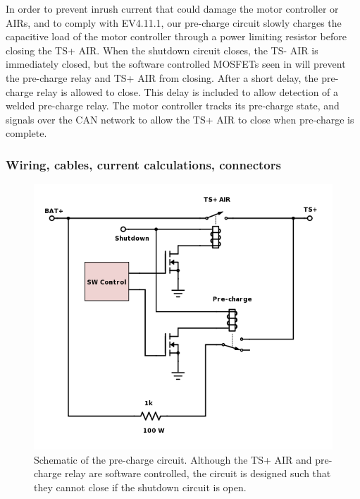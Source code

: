 \documentclass{article}
\begin{document}
In order to prevent inrush current that could damage the motor controller or AIRs, and to comply with EV4.11.1, our pre-charge circuit slowly charges the capacitive load of the motor controller through a power limiting resistor before closing the TS+ AIR. When the shutdown circuit closes, the TS- AIR is immediately closed, but the software controlled MOSFETs seen in  will prevent the pre-charge relay and TS+ AIR from closing. After a short delay, the pre-charge relay is allowed to close. This delay is included to allow detection of a welded pre-charge relay. The motor controller tracks its pre-charge state, and signals over the CAN network to allow the TS+ AIR to close when pre-charge is complete. 

\subsubsection{Wiring, cables, current calculations, connectors}

\begin{figure}[H]
    \centering
    \includegraphics[width = 0.7 \textwidth]{precharge_schem}
    \caption{Schematic of the pre-charge circuit. Although the TS+ AIR and pre-charge relay are software controlled, the circuit is designed such that they cannot close if the shutdown circuit is open.}
    \label{fig:precharge_schem}
\end{figure}
\end{document}
